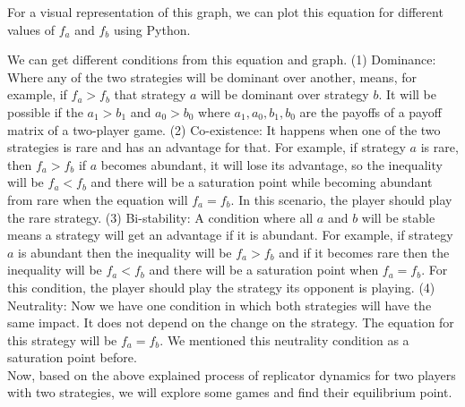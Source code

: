 \documentclass{article}
\begin{document}
For a visual representation of this graph, we can plot this equation for different values of $f_a$ and $f_b$ using Python.
\begin{figure}[h]
        \centering
        \label{fig:Visualization of $x_a(1-x_a)(f_a-f_b)=0$}
    \end{figure}
We can get different conditions from this equation and graph. 
(1) Dominance: Where any of the two strategies will be dominant over another, means, for example, if $f_a>f_b$ that strategy $a$ will be dominant over strategy $b$. It will be possible if the $a_1>b_1$ and $a_0>b_0$ where $a_1,a_0,b_1,b_0$ are the payoffs of a payoff matrix of a two-player game.
(2) Co-existence: It happens when one of the two strategies is rare and has an advantage for that. For example, if strategy $a$ is rare, then $f_a>f_b$ if $a$ becomes abundant, it will lose its advantage, so the inequality will be  $f_a<f_b$ and there will be a saturation point while becoming abundant from rare when the equation will $f_a=f_b$. In this scenario, the player should play the rare strategy.
(3) Bi-stability: A condition where all $a$ and $b$ will be stable means a strategy will get an advantage if it is abundant. For example, if strategy $a$ is abundant then the inequality will be $f_a>f_b$ and if it becomes rare then the inequality will be $f_a<f_b$ and there will be a saturation point when $f_a=f_b$. For this condition, the player should play the strategy its opponent is playing.
(4) Neutrality: Now we have one condition in which both strategies will have the same impact. It does not depend on the change on the strategy. The equation for this strategy will be $f_a=f_b$. We mentioned this neutrality condition as a saturation point before\cite{Gokhale2011}.\\
Now, based on the above explained process of replicator dynamics for two players with two strategies, we will explore some games and find their equilibrium point.\\
\end{document}
